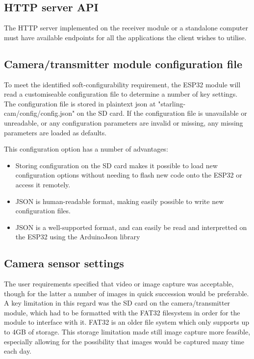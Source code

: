 \subsection{HTTP server API}

The HTTP server implemented on the receiver module or a standalone computer must have available endpoints for all the applications the client wishes to utilise.

\subsection{Camera/transmitter module configuration file}

To meet the identified soft-configurability requirement, the ESP32 module will read a customiseable configuration file to determine a number of key settings. The configuration file is stored in plaintext json at "starling-cam/config/config.json" on the SD card. If the configuration file is unavailable or unreadable, or any configuration parameters are invalid or missing, any missing parameters are loaded as defaults.

This configuration option has a number of advantages:

\begin{itemize}
    \item Storing configuration on the SD card makes it possible to load new configuration options without needing to flash new code onto the ESP32 or access it remotely.
    \item JSON is human-readable format, making easily possible to write new configuration files.
    \item JSON is a well-supported format, and can easily be read and interpretted on the ESP32 using the ArduinoJson library %
\end{itemize}

\subsection{Camera sensor settings}

The user requirements specified that video or image capture was acceptable, though for the latter a number of images in quick succession would be preferable. A key limitation in this regard was the SD card on the camera/transmitter module, which had to be formatted with the FAT32 filesystem in order for the module to interface with it. FAT32 is an older file system which only supports up to 4GB of storage. This storage limitation made still image capture more feasible, especially allowing for the possibility that images would be captured many time each day.

